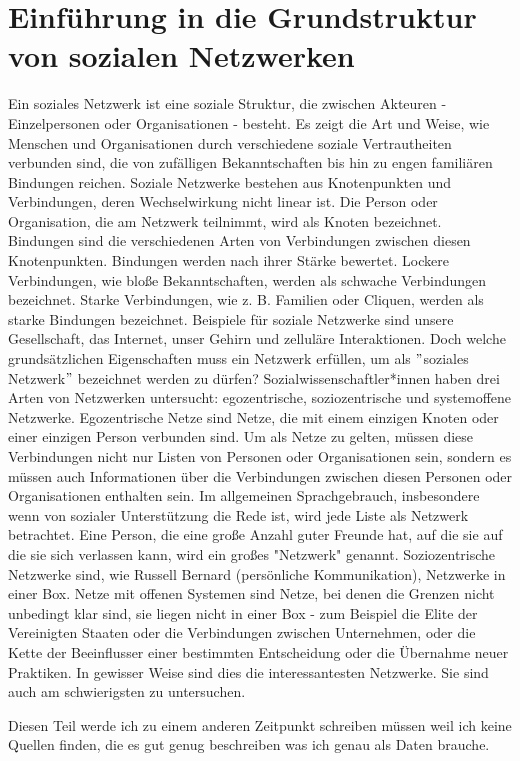 \section{Einführung in die Grundstruktur von sozialen Netzwerken}
Ein soziales Netzwerk ist eine soziale Struktur, die zwischen Akteuren - Einzelpersonen oder Organisationen - besteht. Es zeigt die Art und Weise, wie Menschen und Organisationen durch verschiedene soziale Vertrautheiten verbunden sind, die von zufälligen Bekanntschaften bis hin zu engen familiären Bindungen reichen. Soziale Netzwerke bestehen aus Knotenpunkten und Verbindungen, deren Wechselwirkung nicht linear ist. Die Person oder Organisation, die am Netzwerk teilnimmt, wird als Knoten bezeichnet. Bindungen sind die verschiedenen Arten von Verbindungen zwischen diesen Knotenpunkten. Bindungen werden nach ihrer Stärke bewertet. Lockere Verbindungen, wie bloße Bekanntschaften, werden als schwache Verbindungen bezeichnet. Starke Verbindungen, wie z. B. Familien oder Cliquen, werden als starke Bindungen bezeichnet. Beispiele für soziale Netzwerke sind unsere Gesellschaft, das Internet, unser Gehirn und zelluläre Interaktionen.
Doch welche grundsätzlichen Eigenschaften muss ein Netzwerk erfüllen, um als $"$soziales Netzwerk$"$ bezeichnet werden zu dürfen? 
Sozialwissenschaftler*innen haben drei Arten von Netzwerken untersucht: egozentrische, soziozentrische und systemoffene
Netzwerke. Egozentrische Netze sind Netze, die mit einem einzigen Knoten oder einer einzigen Person verbunden sind. Um als Netze zu gelten, müssen diese Verbindungen nicht nur Listen von Personen oder Organisationen sein, sondern es müssen auch Informationen über die Verbindungen zwischen diesen Personen oder Organisationen enthalten sein. Im allgemeinen Sprachgebrauch, insbesondere wenn von sozialer Unterstützung die Rede ist, wird jede Liste als Netzwerk betrachtet. Eine Person, die eine große Anzahl guter Freunde hat, auf die sie auf die sie sich verlassen kann, wird ein großes "Netzwerk" genannt. Soziozentrische Netzwerke sind, wie Russell Bernard (persönliche Kommunikation), Netzwerke in einer Box. Netze mit offenen Systemen sind Netze, bei denen die Grenzen nicht unbedingt klar sind, sie liegen nicht in einer Box - zum Beispiel die Elite der Vereinigten Staaten oder die Verbindungen zwischen Unternehmen, oder die Kette der Beeinflusser einer bestimmten Entscheidung oder die Übernahme neuer Praktiken. In gewisser Weise sind dies die interessantesten Netzwerke. Sie sind auch am schwierigsten zu untersuchen. 

Diesen Teil werde ich zu einem anderen Zeitpunkt schreiben müssen weil ich keine Quellen finden, die es gut genug beschreiben was ich genau als Daten brauche.




